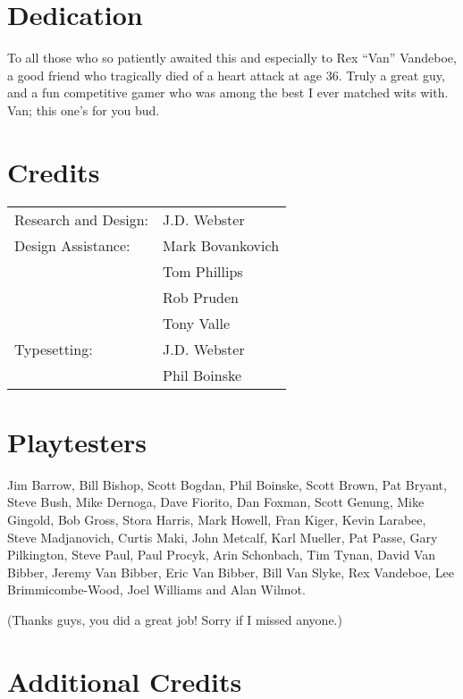 \begin{multicols}{2}

\section*{Dedication}

To all those who so patiently awaited this and especially to Rex “Van” Vandeboe, a good friend who tragically died of a heart attack at age 36. Truly a great guy, and a fun competitive gamer who was among the best I ever matched wits with. Van; this one's for you bud.


\section*{Credits}

\begin{tabular}{@{}p{4cm}l}
Research and Design: &J.D. Webster\\
Design Assistance:   &Mark Bovankovich\\
                     &Tom Phillips\\
                     &Rob Pruden\\
                     &Tony Valle\\
Typesetting:         &J.D. Webster\\
                     &Phil Boinske\\
\end{tabular}

\section*{Playtesters}

Jim Barrow, Bill Bishop, Scott Bogdan, Phil Boinske, Scott Brown, Pat Bryant, Steve Bush, Mike Dernoga, Dave Fiorito, Dan Foxman, Scott Genung, Mike Gingold, Bob Gross, Stora Harris, Mark Howell, Fran Kiger, Kevin Larabee, Steve Madjanovich, Curtis Maki, John Metcalf, Karl Mueller, Pat Passe, Gary Pilkington, Steve Paul, Paul Procyk, Arin Schonbach, Tim Tynan, David Van Bibber, Jeremy Van Bibber, Eric Van Bibber, Bill Van Slyke, Rex Vandeboe, Lee Brimmicombe-Wood, Joel Williams and Alan Wilmot.

(Thanks guys, you did a great job! Sorry if I missed anyone.)

\section*{Additional Credits}


\end{multicols}
